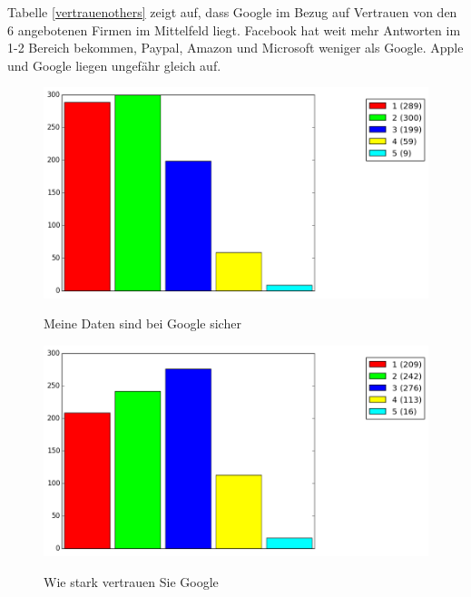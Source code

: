 Tabelle \ref{vertrauenothers} zeigt auf, dass Google im Bezug auf Vertrauen von den 6 angebotenen Firmen im Mittelfeld liegt. Facebook hat weit mehr Antworten im 1-2 Bereich bekommen, Paypal, Amazon und Microsoft weniger als Google. Apple und Google liegen ungefähr gleich auf.
\begin{figure}[H]
\centering
\includegraphics[scale=0.55]{images/datensicher}\\
\caption{Meine Daten sind bei Google sicher}\label{datensicher}
\end{figure}
\begin{figure}[H]
\centering
\includegraphics[scale=0.55]{images/vertrauen}\\
\caption{Wie stark vertrauen Sie Google}\label{vertrauen}
\end{figure}
